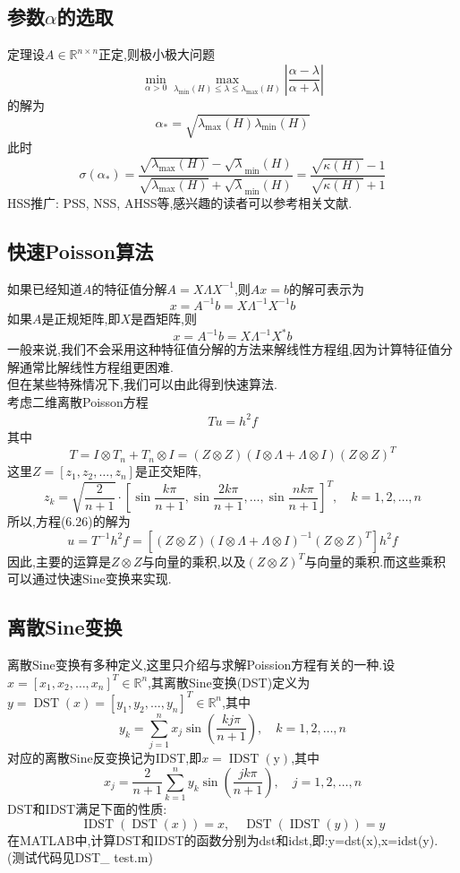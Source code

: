 \documentclass[12pt,a4paper]{article}
\begin{document}
\subsection*{参数$\alpha$的选取}
{\color{blue}定理}\qquad 设$A \in \mathbb{R}^{n \times n}$正定,则极小极大问题
$$
\min _{\alpha>0} \max _{\lambda_{\min }(H) \leq \lambda \leq \lambda_{\max }(H)}\left|\frac{\alpha-\lambda}{\alpha+\lambda}\right|
$$
的解为
$$
\alpha_{*}=\sqrt{\lambda_{\max }(H) \lambda_{\min }(H)}
$$
此时
$$
\sigma\left(\alpha_{*}\right)=\frac{\sqrt{\lambda_{\max }(H)}-\sqrt{\lambda}_{\min }(H)}{\sqrt{\lambda_{\max }(H)}+\sqrt{\lambda}_{\min }(H)}=\frac{\sqrt{\kappa(H)}-1}{\sqrt{\kappa(H)}+1}
$$
HSS推广: PSS, NSS, AHSS等,感兴趣的读者可以参考相关文献.\\
\subsection{快速Poisson算法}
如果已经知道$A$的特征值分解$A=X \Lambda X^{-1}$,则$Ax=b$的解可表示为
$$
x=A^{-1} b=X \Lambda^{-1} X^{-1} b
$$
如果$A$是正规矩阵,即$X$是酉矩阵,则
$$
x=A^{-1} b=X \Lambda^{-1} X^{*} b
$$
一般来说,我们不会采用这种特征值分解的方法来解线性方程组,因为计算特征值分解通常比解线性方程组更困难.\\
但在某些特殊情况下,我们可以由此得到快速算法.\\
考虑二维离散Poisson方程
\begin{align*}
T u=h^{2} f
\tag{6.26}
\end{align*}
其中
$$
T=I \otimes T_{n}+T_{n} \otimes I=(Z \otimes Z)(I \otimes \Lambda+\Lambda \otimes I)(Z \otimes Z)^{T}
$$
这里$Z=\left[z_{1}, z_{2}, \ldots, z_{n}\right]$是正交矩阵,
$$
z_{k}=\sqrt{\frac{2}{n+1}} \cdot\left[\sin \frac{k \pi}{n+1}, \sin \frac{2 k \pi}{n+1}, \ldots, \sin \frac{n k \pi}{n+1}\right]^{T}, \quad k=1,2, \ldots, n
$$
所以,方程(6.26)的解为
$$
u=T^{-1} h^{2} f=\left[(Z \otimes Z)(I \otimes \Lambda+\Lambda \otimes I)^{-1}(Z \otimes Z)^{T}\right] h^{2} f
$$
因此,主要的运算是$Z \otimes Z$与向量的乘积,以及$(Z \otimes Z)^{T}$与向量的乘积.而这些乘积可以通过快速Sine变换来实现.\\
\subsection*{离散Sine变换}
离散Sine变换有多种定义,这里只介绍与求解Poission方程有关的一种.设$x=\left[x_{1}, x_{2}, \ldots, x_{n}\right]^{T} \in \mathbb{R}^{n}$,其{\color{blue}离散Sine变换(DST)}定义为$y=\operatorname{DST}(x)=\left[y_{1}, y_{2}, \ldots, y_{n}\right]^{T} \in \mathbb{R}^{n}$,其中
$$
y_{k}=\sum_{j=1}^{n} x_{j} \sin \left(\frac{k j \pi}{n+1}\right), \quad k=1,2, \ldots, n
$$
对应的离散Sine反变换记为IDST,即$x=\operatorname{IDST}(\mathrm{y})$,其中  
$$
x_{j}=\frac{2}{n+1} \sum_{k=1}^{n} y_{k} \sin \left(\frac{j k \pi}{n+1}\right), \quad j=1,2, \ldots, n
$$
DST和IDST满足下面的性质:
$$
\operatorname{IDST}(\operatorname{DST}(x))=x, \quad \operatorname{DST}(\operatorname{IDST}(y))=y
$$
在MATLAB中,计算DST和IDST的函数分别为{\color{blue}dst}和{\color{blue}idst},即:{\color{blue}y=dst(x),x=idst(y)}. (测试代码见{\color{blue}DST\_ test.m})\\
\end{document}
